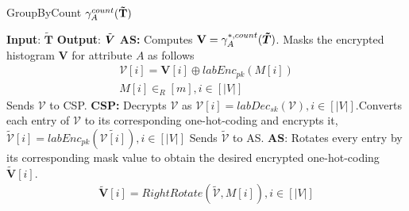 \begin{algorithm}[H]
\caption{\textsf{GroupByCount }$\gamma^{count}_A(\mathbf{\tilde{T}})$}
\begin{algorithmic}[1]
\STATEx
\textbf{Input}: $\mathbf{\tilde{T}}$
\STATEx \textbf{Output}: $\tilde{\boldsymbol{V}}$
\STATEx \textbf{\textsf{AS}:} \STATE Computes $\mathbf{V}=\gamma^{*,count}_{A}(\boldsymbol{\tilde{T}})$.
\STATE Masks the encrypted histogram $\mathbf{V}$ for attribute $A$ as follows \begin{gather*}\boldsymbol{\mathcal{V}}[i]= \mathbf{V}[i] \oplus labEnc_{pk}(M[i])\\M[i] \in_R [m], i \in [|V|]\end{gather*}
\STATE Sends $\boldsymbol{\mathcal{V}}$ to \textsf{CSP}.
\STATEx \textbf{\textsf{CSP}:}
\STATE Decrypts  $\boldsymbol{\mathcal{V}}$ as $\mathcal{V}[i]=labDec_{sk}(\boldsymbol{\mathcal{V}}), i \in [|V|]$.\STATE Converts each entry of $\mathcal{V}$ to its corresponding one-hot-coding and encrypts it, $\boldsymbol{\tilde{\mathcal{V}}}[i]=labEnc_{pk}(\tilde{\mathcal{V}[i]}), i \in [|V|]$
\STATE Sends $\boldsymbol{\tilde{\mathcal{V}}}$ to \textsf{AS}.
\STATEx \textbf{\textsf{AS}}:
\STATE  Rotates every entry by its corresponding mask value to obtain the desired  encrypted one-hot-coding $\boldsymbol{\tilde{V}}[i]$. \begin{gather*}\boldsymbol{\tilde{V}}[i]=RightRotate(\boldsymbol{\tilde{\mathcal{V}}},M[i]), i \in [|V|]\end{gather*} 
 \end{algorithmic} \label{groupby-imp}
\end{algorithm} 
 